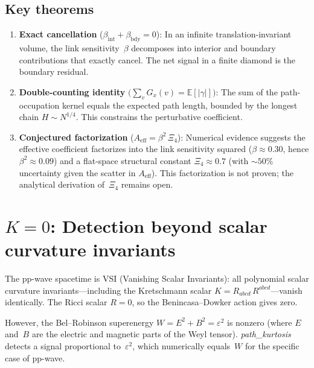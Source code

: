 \documentclass[11pt,a4paper]{article}
\begin{document}
\subsection{Key theorems}
\label{ssec:theorems}

\begin{enumerate}
  \item \textbf{Exact cancellation} ($\beta_{\mathrm{int}} + \beta_{\mathrm{bdy}} = 0$):
    In an infinite translation-invariant volume, the link sensitivity~$\beta$ decomposes
    into interior and boundary contributions that exactly cancel.  The net signal in a
    finite diamond is the boundary residual.

  \item \textbf{Double-counting identity}
    $\bigl(\sum_{v} G_{x}(v) = \mathbb{E}[|\gamma|]\bigr)$:
    The sum of the path-occupation kernel equals the expected path length, bounded by the
    longest chain $H \sim N^{1/4}$.  This constrains the perturbative coefficient.

  \item \textbf{Conjectured factorization} ($A_{\mathrm{eff}} = \beta^{2}\,\Xi_{4}$):
    Numerical evidence suggests the effective coefficient factorizes into the link
    sensitivity squared ($\beta \approx 0.30$, hence $\beta^{2} \approx 0.09$) and a
    flat-space structural constant $\Xi_{4} \approx 0.7$ (with ${\sim}50\%$ uncertainty
    given the scatter in $A_{\mathrm{eff}}$).  This factorization is not proven; the
    analytical derivation of~$\Xi_{4}$ remains open.
\end{enumerate}

\section{\texorpdfstring{$K = 0$}{K = 0}: Detection beyond scalar curvature invariants}
\label{sec:K0}

The pp-wave spacetime is VSI (Vanishing Scalar Invariants): all polynomial scalar
curvature invariants---including the Kretschmann scalar
$K = R_{abcd}\,R^{abcd}$---vanish identically.  The Ricci scalar $R = 0$, so the
Benincasa--Dowker action gives zero.

However, the Bel--Robinson superenergy $W = E^{2} + B^{2} = \varepsilon^{2}$ is nonzero
(where $E$ and~$B$ are the electric and magnetic parts of the Weyl tensor).
\textit{path\_kurtosis} detects a signal proportional to~$\varepsilon^{2}$, which
numerically equals~$W$ for the specific case of pp-wave.
\end{document}
